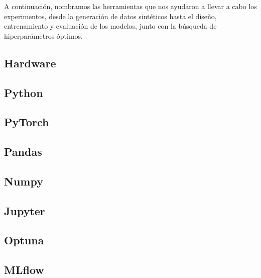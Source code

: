 \documentclass[../../main.tex]{subfiles}
\begin{document}
A continuación, nombramos las herramientas que nos ayudaron a llevar a cabo los
experimentos, desde la generación de datos sintéticos hasta el diseño, entrenamiento y
evaluación de los modelos, junto con la búsqueda de hiperparámetros óptimos.

\subsection{Hardware}

\subsection{Python}

\subsection{PyTorch}

\subsection{Pandas}

\subsection{Numpy}

\subsection{Jupyter}

\subsection{Optuna}

\subsection{MLflow}
\end{document}
